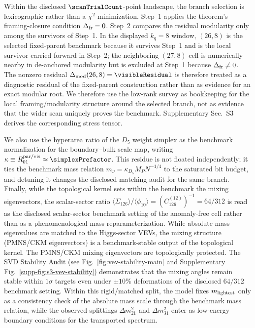 \documentclass[11pt]{article}
\begin{document}
Within the disclosed $\scanTrialCount$-point landscape, the branch selection is lexicographic rather than a $\chi^2$ minimization. Step~1 applies the theorem's framing-closure condition $\Delta_{\rm fr}=0$. Step~2 compares the residual modularity only among the survivors of Step~1. In the displayed $k_q=8$ window, $(26,8)$ is the selected fixed-parent benchmark because it survives Step~1 and is the local survivor carried forward in Step~2; the neighboring $(27,8)$ cell is numerically nearby in de-anchored modularity but is excluded at Step~1 because $\Delta_{\rm fr}\neq0$. The nonzero residual $\Delta_{\rm mod}(26,8)=\visibleResidual$ is therefore treated as a diagnostic residual of the fixed-parent construction rather than as evidence for an exact modular root. We therefore use the low-rank survey as bookkeeping for the local framing/modularity structure around the selected branch, not as evidence that the wider scan uniquely proves the benchmark. Supplementary Sec.~S3 derives the corresponding stress tensor.

We also use the hyperarea ratio of the $D_5$ weight simplex as the benchmark normalization for the boundary--bulk scale map, writing $\kappa\equiv R_{01}^{\rm par/vis}\approx\simplexPrefactor$. This residue is not floated independently; it ties the benchmark mass relation $m_\nu=\kappa_{D_5}M_PN^{-1/4}$ to the saturated bit budget, and detuning it changes the disclosed matching audit for the same branch. Finally, while the topological kernel sets within the benchmark the mixing eigenvectors, the scalar-sector ratio $\langle \Sigma_{126} \rangle / \langle \phi_{10} \rangle=(C_{126}^{(12)})^{-1}=64/312$ is read as the disclosed scalar-sector benchmark setting of the anomaly-free cell rather than as a phenomenological mass reparameterization. While absolute mass eigenvalues are matched to the Higgs-sector VEVs, the mixing structure (PMNS/CKM eigenvectors) is a benchmark-stable output of the topological kernel. The PMNS/CKM mixing eigenvectors are topologically protected. The SVD Stability Audit (see Fig.~\ref{fig:vev-stability-main} and Supplementary Fig.~\ref{supp-fig:s3-vev-stability}) demonstrates that the mixing angles remain stable within $1\sigma$ targets even under $\pm10\%$ deformations of the disclosed $64/312$ benchmark setting. Within this rigid/matched split, the model fixes $m_{\rm lightest}$ only as a consistency check of the absolute mass scale through the benchmark mass relation, while the observed splittings $\Delta m_{21}^2$ and $\Delta m_{31}^2$ enter as low-energy boundary conditions for the transported spectrum.
\end{document}

